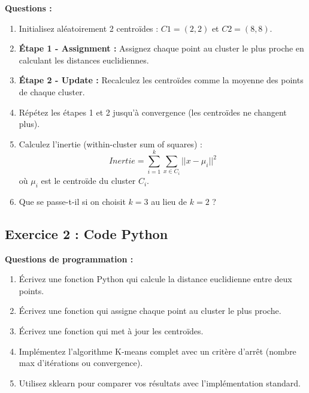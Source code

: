 \documentclass[11pt,a4paper]{article}
\begin{document}
\begin{questionbox}
\textbf{Questions :}
\begin{enumerate}
    \item Initialisez aléatoirement 2 centroïdes : $C1 = (2, 2)$ et $C2 = (8, 8)$.
    
    \item \textbf{Étape 1 - Assignment :} Assignez chaque point au cluster le plus proche en calculant les distances euclidiennes.
    
    \item \textbf{Étape 2 - Update :} Recalculez les centroïdes comme la moyenne des points de chaque cluster.
    
    \item Répétez les étapes 1 et 2 jusqu'à convergence (les centroïdes ne changent plus).
    
    \item Calculez l'inertie (within-cluster sum of squares) :
    $$Inertie = \sum_{i=1}^{k}\sum_{x \in C_i}||x - \mu_i||^2$$
    où $\mu_i$ est le centroïde du cluster $C_i$.
    
    \item Que se passe-t-il si on choisit $k=3$ au lieu de $k=2$ ?
\end{enumerate}
\end{questionbox}

\subsection{Exercice 2 : Code Python}

\begin{questionbox}
\textbf{Questions de programmation :}
\begin{enumerate}
    \item Écrivez une fonction Python qui calcule la distance euclidienne entre deux points.
    
    \item Écrivez une fonction qui assigne chaque point au cluster le plus proche.
    
    \item Écrivez une fonction qui met à jour les centroïdes.
    
    \item Implémentez l'algorithme K-means complet avec un critère d'arrêt (nombre max d'itérations ou convergence).
    
    \item Utilisez sklearn pour comparer vos résultats avec l'implémentation standard.
\end{enumerate}
\end{questionbox}
\end{document}
